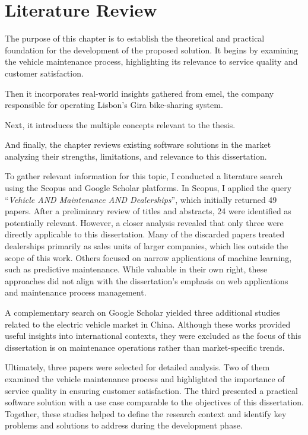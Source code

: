 \chapter{Literature Review}%
\label{chapter:literatureReview}

\begin{introduction}
The purpose of this chapter is to establish the theoretical and practical foundation for the development of the proposed solution. It begins by examining the vehicle maintenance process, highlighting its relevance to service quality and customer satisfaction. 

Then it incorporates real-world insights gathered from \ac{emel}, the company responsible for operating Lisbon's Gira bike-sharing system. 

Next, it introduces the multiple concepts relevant to the thesis.

And finally, the chapter reviews existing software solutions in the market analyzing their strengths, limitations, and relevance to this dissertation.
\end{introduction} 

To gather relevant information for this topic, I conducted a literature search using the Scopus and Google Scholar platforms. In Scopus, I applied the query “\textit{Vehicle AND Maintenance AND Dealerships}”, which initially returned 49 papers. After a preliminary review of titles and abstracts, 24 were identified as potentially relevant. However, a closer analysis revealed that only three were directly applicable to this dissertation. Many of the discarded papers treated dealerships primarily as sales units of larger companies, which lies outside the scope of this work. Others focused on narrow applications of machine learning, such as predictive maintenance. While valuable in their own right, these approaches did not align with the dissertation's emphasis on web applications and maintenance process management.

A complementary search on Google Scholar yielded three additional studies related to the electric vehicle market in China. Although these works provided useful insights into international contexts, they were excluded as the focus of this dissertation is on maintenance operations rather than market-specific trends.

Ultimately, three papers were selected for detailed analysis. Two of them examined the vehicle maintenance process and highlighted the importance of service quality in ensuring customer satisfaction. The third presented a practical software solution with a use case comparable to the objectives of this dissertation. Together, these studies helped to define the research context and identify key problems and solutions to address during the development phase.

